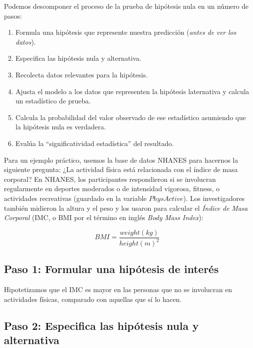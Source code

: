 \documentclass[
  12pt,
]{book}
\providecommand{\tightlist}{%
  \setlength{\itemsep}{0pt}\setlength{\parskip}{0pt}}
\theoremstyle{definition}
\theoremstyle{definition}
\theoremstyle{definition}
\theoremstyle{remark}
\begin{document}
Podemos descomponer el proceso de la prueba de hipótesis nula en un número de pasos:

\begin{enumerate}
\def\labelenumi{\arabic{enumi}.}
\tightlist
\item
  Formula una hipótesis que represente nuestra predicción (\emph{antes de ver los datos}).
\item
  Especifica las hipótesis nula y alternativa.
\item
  Recolecta datos relevantes para la hipótesis.
\item
  Ajusta el modelo a los datos que representen la hipótesis laternativa y calcula un estadístico de prueba.
\item
  Calcula la probabilidad del valor observado de ese estadístico asumiendo que la hipótesis nula es verdadera.
\item
  Evalúa la ``significatividad estadística'' del resultado.
\end{enumerate}

Para un ejemplo práctico, usemos la base de datos NHANES para hacernos la siguiente pregunta: ¿La actividad física está relacionada con el índice de masa corporal? En NHANES, los participantes respondieron si se involucran regularmente en deportes moderados o de intensidad vigorosa, fitness, o actividades recreativas (guardado en la variable \(PhysActive\)). Los investigadores también midieron la altura y el peso y los usaron para calcular el \emph{Índice de Masa Corporal} (IMC, o BMI por el término en inglés \emph{Body Mass Index}):

\[
BMI = \frac{weight(kg)}{height(m)^2}
\]

\hypertarget{paso-1-formular-una-hipuxf3tesis-de-interuxe9s}{%
\subsection{Paso 1: Formular una hipótesis de interés}\label{paso-1-formular-una-hipuxf3tesis-de-interuxe9s}}

Hipotetizamos que el IMC es mayor en las personas que no se involucran en actividades físicas, comparado con aquellas que sí lo hacen.

\hypertarget{paso-2-especifica-las-hipuxf3tesis-nula-y-alternativa}{%
\subsection{Paso 2: Especifica las hipótesis nula y alternativa}\label{paso-2-especifica-las-hipuxf3tesis-nula-y-alternativa}}
\end{document}
